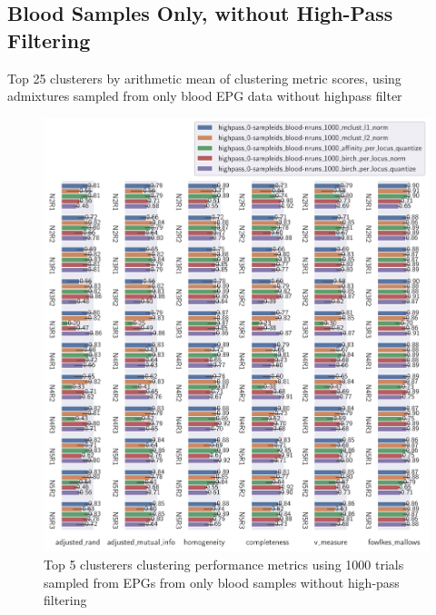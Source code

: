 \begin{theappendices}
\FloatBarrier
\subsection{Blood Samples Only, without High-Pass Filtering}

\begin{table}[htbp]
\centering
{}
\caption{Top 25 clusterers by arithmetic mean of clustering metric scores, using admixtures sampled from only blood EPG data without highpass filter}
\label{appendix:table:top_25_not_ensemble_clusterers_by_metrics_highpass_0-sampleids_blood-nruns_1000}
\end{table}

\begin{figure}[htbp]
\centering
\includegraphics[width=\textwidth]{./figures/clust_comparison/highpass_0-sampleids_blood-nruns_1000_top_5_clusterers_by_metrics.pdf}
\caption{Top 5 clusterers clustering performance metrics using 1000 trials sampled from EPGs from only blood samples without high-pass filtering}
\label{appendix:fig:highpass_0-sampleids_blood-nruns_1000_top_5_clusterers_by_metrics}
\end{figure}


\end{theappendices}
